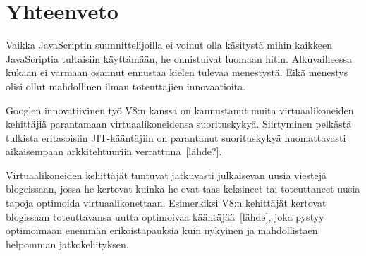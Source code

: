 \section{Yhteenveto}

Vaikka JavaScriptin suunnittelijoilla ei voinut olla käsitystä mihin kaikkeen JavaScriptia tultaisiin käyttämään, he onnistuivat luomaan hitin. Alkuvaiheessa kukaan ei varmaan osannut ennustaa kielen tulevaa menestystä. Eikä menestys olisi ollut mahdollinen ilman toteuttajien innovaatioita.

Googlen innovatiivinen työ V8:n kanssa on kannustanut muita virtuaalikoneiden kehittäjiä parantamaan virtuaalikoneidensa suorituskykyä. Siirtyminen pelkästä tulkista eritasoisiin JIT-kääntäjiin on parantanut suorituskykyä huomattavasti aikaisempaan arkkitehtuuriin verrattuna~[lähde?].

Virtuaalikoneiden kehittäjät tuntuvat jatkuvasti julkaisevan uusia viestejä blogeissaan, jossa he kertovat kuinka he ovat taas keksineet tai toteuttaneet uusia tapoja optimoida virtuaalikonettaan. Esimerkiksi V8:n kehittäjät kertovat blogissaan toteuttavansa uutta optimoivaa kääntäjää~[lähde], joka pystyy optimoimaan enemmän erikoistapauksia kuin nykyinen ja mahdollistaen helpomman jatkokehityksen.

